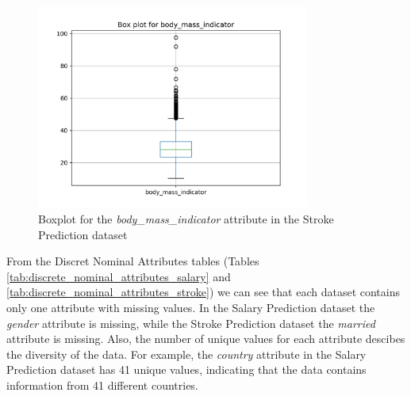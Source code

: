 \documentclass[runningheads]{paper}
\begin{document}
\begin{figure}[H]
    \centering
    \includegraphics[width=0.8\textwidth]{../plots/box_plot_body_mass_indicator_AVC_full.png}
    \caption{Boxplot for the \textit{body\_mass\_indicator} attribute in the Stroke Prediction dataset}
    \label{fig:boxplot_example_stroke}
\end{figure}

From the Discret Nominal Attributes tables (Tables \ref{tab:discrete_nominal_attributes_salary} and \ref{tab:discrete_nominal_attributes_stroke})
we can see that each dataset contains
only one attribute with missing values. In the Salary Prediction dataset 
the \textit{gender} attribute is missing, while the Stroke Prediction dataset the
\textit{married} attribute is missing. Also, the number of unique values for each attribute
descibes the diversity of the data. For example, the \textit{country} attribute
in the Salary Prediction dataset has 41 unique values, indicating that the data
contains information from 41 different countries.
\end{document}
